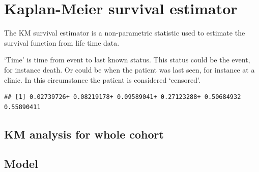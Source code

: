 \documentclass[]{book}
\makeatletter
\newenvironment{Shaded}{\begin{snugshade}}{\end{snugshade}}
\newcommand{\CommentTok}[1]{\textcolor[rgb]{0.56,0.35,0.01}{\textit{#1}}}
\newcommand{\DecValTok}[1]{\textcolor[rgb]{0.00,0.00,0.81}{#1}}
\newcommand{\KeywordTok}[1]{\textcolor[rgb]{0.13,0.29,0.53}{\textbf{#1}}}
\newcommand{\NormalTok}[1]{#1}
\newcommand{\OperatorTok}[1]{\textcolor[rgb]{0.81,0.36,0.00}{\textbf{#1}}}
\newcommand{\StringTok}[1]{\textcolor[rgb]{0.31,0.60,0.02}{#1}}
\newenvironment{kframe}{%
\medskip{}
\setlength{\fboxsep}{.8em}
 \def\at@end@of@kframe{}%
 \ifinner\ifhmode%
  \def\at@end@of@kframe{\end{minipage}}%
  \begin{minipage}{\columnwidth}%
 \fi\fi%
 \def\FrameCommand##1{\hskip\@totalleftmargin \hskip-\fboxsep
 \colorbox{shadecolor}{##1}\hskip-\fboxsep
     \hskip-\linewidth \hskip-\@totalleftmargin \hskip\columnwidth}%
 \MakeFramed {\advance\hsize-\width
   \@totalleftmargin\z@ \linewidth\hsize
   \@setminipage}}%
 {\par\unskip\endMakeFramed%
 \at@end@of@kframe}
\renewenvironment{Shaded}{\begin{kframe}}{\end{kframe}}
\theoremstyle{definition}
\theoremstyle{definition}
\theoremstyle{definition}
\theoremstyle{remark}
\makeatother
\begin{document}
\hypertarget{kaplan-meier-survival-estimator}{%
\section{Kaplan-Meier survival
estimator}\label{kaplan-meier-survival-estimator}}

The KM survival estimator is a non-parametric statistic used to estimate
the survival function from life time data.

`Time' is time from event to last known status. This status could be the
event, for instance death. Or could be when the patient was last seen,
for instance at a clinic. In this circumstance the patient is considered
`censored'.

\begin{Shaded}
\end{Shaded}

\begin{verbatim}
## [1] 0.02739726+ 0.08219178+ 0.09589041+ 0.27123288+ 0.50684932  0.55890411
\end{verbatim}

\hypertarget{km-analysis-for-whole-cohort}{%
\subsection{KM analysis for whole
cohort}\label{km-analysis-for-whole-cohort}}

\hypertarget{model}{%
\subsection{Model}\label{model}}
\end{document}
